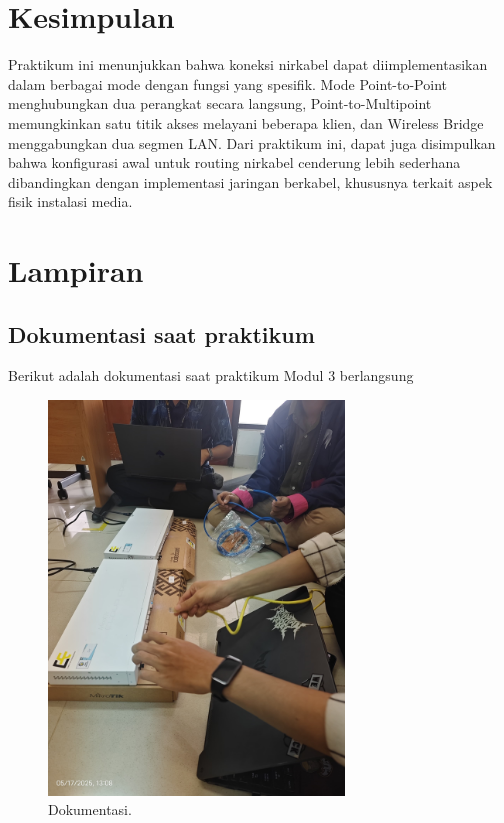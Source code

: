 \section{Kesimpulan}
Praktikum ini menunjukkan bahwa koneksi nirkabel dapat diimplementasikan dalam berbagai mode dengan fungsi yang spesifik. Mode Point-to-Point menghubungkan dua perangkat secara langsung, Point-to-Multipoint memungkinkan satu titik akses melayani beberapa klien, dan Wireless Bridge menggabungkan dua segmen LAN. Dari praktikum ini, dapat juga disimpulkan bahwa konfigurasi awal untuk routing nirkabel cenderung lebih sederhana dibandingkan dengan implementasi jaringan berkabel, khususnya terkait aspek fisik instalasi media.

\newpage
\section{Lampiran}
\subsection*{Dokumentasi saat praktikum}
Berikut adalah dokumentasi saat praktikum Modul 3 berlangsung
\begin{figure}[h!]
    \centering
    \includegraphics[width=0.7\textwidth]{img/Lampiran3.jpeg} 
    \caption{Dokumentasi.}
    \label{fig:ping_tambahan_lampiran}
\end{figure}




